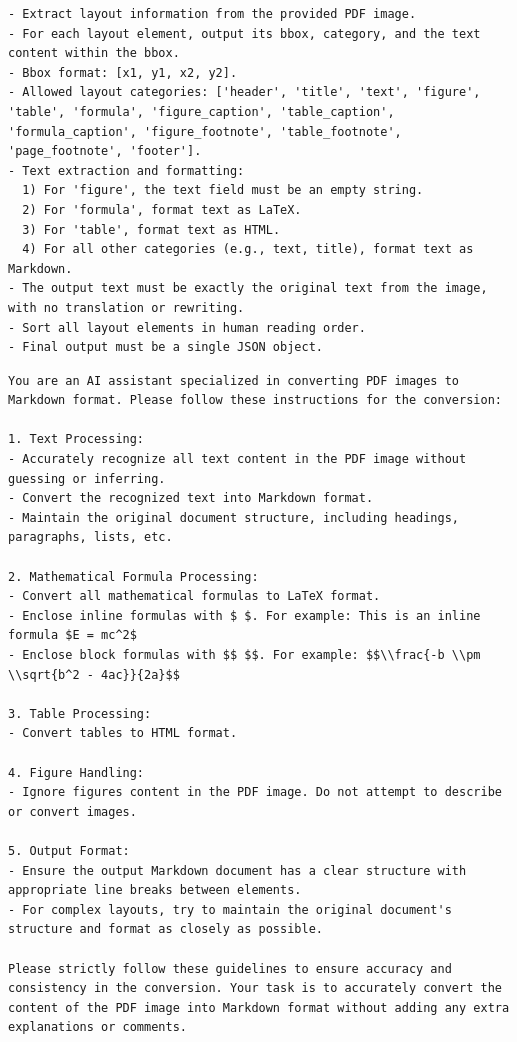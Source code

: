 \begin{tcolorbox}[
  colback=gray!5,
  colframe=gray!60,
  title={Prompt for doc2json},
  fonttitle=\bfseries,
  breakable
]
\begin{lstlisting}[style=promptlisting, breakautoindent=false, breakindent=0pt]
- Extract layout information from the provided PDF image.
- For each layout element, output its bbox, category, and the text content within the bbox.
- Bbox format: [x1, y1, x2, y2].
- Allowed layout categories: ['header', 'title', 'text', 'figure', 'table', 'formula', 'figure_caption', 'table_caption', 'formula_caption', 'figure_footnote', 'table_footnote', 'page_footnote', 'footer'].
- Text extraction and formatting:
  1) For 'figure', the text field must be an empty string.
  2) For 'formula', format text as LaTeX.
  3) For 'table', format text as HTML.
  4) For all other categories (e.g., text, title), format text as Markdown.
- The output text must be exactly the original text from the image, with no translation or rewriting.
- Sort all layout elements in human reading order.
- Final output must be a single JSON object.
\end{lstlisting}
\end{tcolorbox}

\begin{tcolorbox}[
  colback=gray!5,
  colframe=gray!60,
  title={Prompt for doc2md},
  fonttitle=\bfseries,
  breakable
]
\begin{lstlisting}[style=promptlisting, breakautoindent=false, breakindent=0pt]
You are an AI assistant specialized in converting PDF images to Markdown format. Please follow these instructions for the conversion:

1. Text Processing:
- Accurately recognize all text content in the PDF image without guessing or inferring.
- Convert the recognized text into Markdown format.
- Maintain the original document structure, including headings, paragraphs, lists, etc.

2. Mathematical Formula Processing:
- Convert all mathematical formulas to LaTeX format.
- Enclose inline formulas with $ $. For example: This is an inline formula $E = mc^2$
- Enclose block formulas with $$ $$. For example: $$\\frac{-b \\pm \\sqrt{b^2 - 4ac}}{2a}$$

3. Table Processing:
- Convert tables to HTML format.

4. Figure Handling:
- Ignore figures content in the PDF image. Do not attempt to describe or convert images.

5. Output Format:
- Ensure the output Markdown document has a clear structure with appropriate line breaks between elements.
- For complex layouts, try to maintain the original document's structure and format as closely as possible.

Please strictly follow these guidelines to ensure accuracy and consistency in the conversion. Your task is to accurately convert the content of the PDF image into Markdown format without adding any extra explanations or comments.
\end{lstlisting}
\end{tcolorbox}

